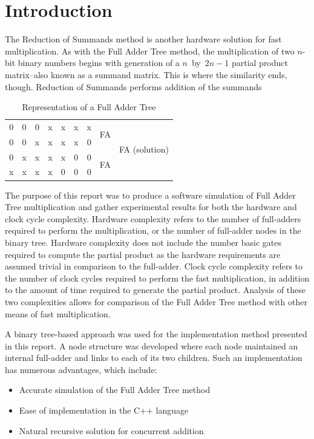 \documentclass{article}
\begin{document}
\section{Introduction}
The Reduction of Summands method is another hardware solution for fast multiplication. As with the Full Adder Tree method, the multiplication of two $n$-bit binary numbers begins with generation of a $n$~by~$2n-1$ partial product matrix--also known as a summand matrix. This is where the similarity ends, though. Reduction of Summands performs addition of the summands 

\begin{table}[h]
	\begin{center}
	\begin{tabular}{ *{7}{c} | *{2}{c} }
		0&0&0&x&x&x&x & \multirow{2}{*}{FA} & \multirow{4}{*}{FA (solution)} \\
		0&0&x&x&x&x&0 & \\
		0&x&x&x&x&0&0 & \multirow{2}{*}{FA} \\
		x&x&x&x&0&0&0 & \\
	\end{tabular}
	\end{center}
	\caption{Representation of a Full Adder Tree}
	\label{FAT_Representation}
\end{table}

The purpose of this report was to produce a software simulation of Full Adder Tree multiplication and gather experimental results for both the hardware and clock cycle complexity. Hardware complexity refers to the number of full-adders required to perform the multiplication, or the number of full-adder nodes in the binary tree. Hardware complexity does not include the number basic gates required to compute the partial product as the hardware requirements are assumed trivial in comparison to the full-adder. Clock cycle complexity refers to the number of clock cycles required to perform the fast multiplication, in addition to the amount of time required to generate the partial product. Analysis of these two complexities allows for comparison of the Full Adder Tree method with other means of fast multiplication.

A binary tree-based approach was used for the implementation method presented in this report. A node structure was developed where each node maintained an internal full-adder and links to each of its two children. Such an implementation has numerous advantages, which include:

\begin{itemize}
	\item	Accurate simulation of the Full Adder Tree method
	\item Ease of implementation in the C++ language
	\item Natural recursive solution for concurrent addition
\end{itemize}
\end{document}
